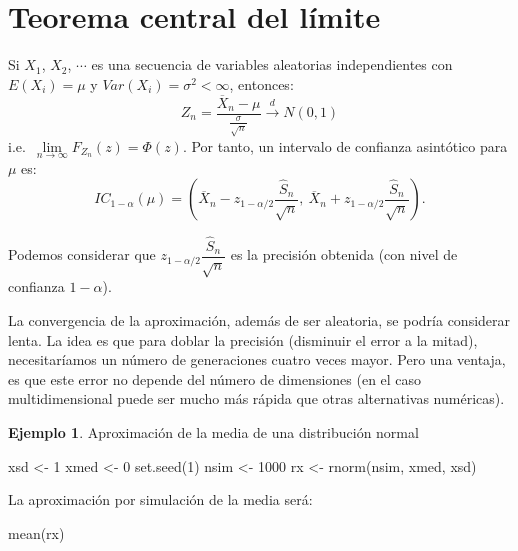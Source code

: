 \documentclass[
]{book}
\newenvironment{Shaded}{\begin{snugshade}}{\end{snugshade}}
\newcommand{\DecValTok}[1]{\textcolor[rgb]{0.00,0.00,0.81}{#1}}
\newcommand{\FunctionTok}[1]{\textcolor[rgb]{0.00,0.00,0.00}{#1}}
\newcommand{\NormalTok}[1]{#1}
\newcommand{\OtherTok}[1]{\textcolor[rgb]{0.56,0.35,0.01}{#1}}
\theoremstyle{break}
\theoremstyle{definition}
\theoremstyle{definition}
\newtheorem{example}{Ejemplo}[chapter]
\theoremstyle{definition}
\theoremstyle{definition}
\theoremstyle{remark}
\begin{document}
\hypertarget{teorema-central-del-luxedmite}{%
\section{Teorema central del límite}\label{teorema-central-del-luxedmite}}

Si \(X_{1}\), \(X_{2}\), \(\cdots\) es una secuencia de variables aleatorias
independientes con \(E\left( X_{i}\right) =\mu\) y
\(Var\left( X_{i}\right) = \sigma ^{2}<\infty\), entonces:
\[Z_{n}=\frac{\overline{X}_{n}-\mu }{\frac{\sigma }{\sqrt{n}}}
\overset{d}{ \rightarrow } N(0,1)\]
i.e.~\(\lim\limits_{n\rightarrow \infty }F_{Z_{n}}(z)=\Phi (z)\).
Por tanto, un intervalo de confianza asintótico para \(\mu\) es:
\[IC_{1-\alpha }(\mu ) = \left( \overline{X}_{n}
- z_{1-\alpha /2}\dfrac{\widehat{S}_{n}}{\sqrt{n}},\ 
\overline{X}_n+z_{1-\alpha /2}\dfrac{\widehat{S}_{n}}{\sqrt{n}} \right).\]

Podemos considerar que
\(z_{1-\alpha /2}\dfrac{\widehat{S}_{n}}{\sqrt{n}}\)
es la precisión obtenida (con nivel de confianza \(1-\alpha\)).

La convergencia de la aproximación, además de ser aleatoria, se podría considerar lenta.
La idea es que para doblar la precisión (disminuir el error a la mitad), necesitaríamos un número de generaciones cuatro veces mayor. Pero una ventaja, es que este error no depende del número de dimensiones (en el caso multidimensional puede ser mucho más rápida que otras alternativas numéricas).

\begin{example}
\protect\hypertarget{exm:unnamed-chunk-5}{}{\label{exm:unnamed-chunk-5} }Aproximación de la media de una distribución normal
\end{example}

\begin{Shaded}
\begin{Highlighting}[]
\NormalTok{xsd }\OtherTok{\textless{}{-}} \DecValTok{1}
\NormalTok{xmed }\OtherTok{\textless{}{-}} \DecValTok{0}
\FunctionTok{set.seed}\NormalTok{(}\DecValTok{1}\NormalTok{)}
\NormalTok{nsim }\OtherTok{\textless{}{-}} \DecValTok{1000}
\NormalTok{rx }\OtherTok{\textless{}{-}} \FunctionTok{rnorm}\NormalTok{(nsim, xmed, xsd)}
\end{Highlighting}
\end{Shaded}

La aproximación por simulación de la media será:

\begin{Shaded}
\begin{Highlighting}[]
\FunctionTok{mean}\NormalTok{(rx)}
\end{Highlighting}
\end{Shaded}
\end{document}
